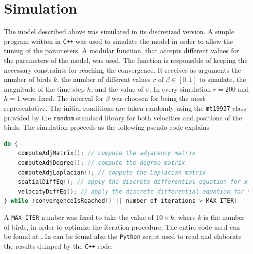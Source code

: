 \documentclass{article} %
\newcounter{late}
\begin{document}
\section {Simulation}
The model described above was simulated in its discretized version.
A simple program written in \verb|C++| was used to simulate the model in order to allow the
tuning of the parameters.
A modular function, that accepts different values for the parameters of the model, was used.
The function is responsible of keeping the necessary constraints for reaching the convergence.
It receives as arguments the number of birds $k$, the number of different values $r$
of $\beta\in[0,1]$ to simulate, the magnitude of the time step $h$, and the value of $\sigma$.
In every simulation $r=200$ and $h=1$ were fixed.
The interval for $\beta$ was choosen for being the most representative.
The initial conditions are taken randomly using the \Verb|mt19937| class provided by the 
\verb|random| standard library for both velocities and positions of the birds.
The simulation proceeds as the following pseudo-code explains
\begin{lstlisting}[language=C++]
do {
    computeAdjMatrix(); // compute the adjacency matrix
    computeAdjDegree(); // compute the degree matrix
    computeAdjLaplacian(); // compute the Laplacian matrix
    spatialDiffEq(); // apply the discrete differential equation for x
    velocityDiffEq(); // apply the discrete differential equation for v
} while (convergenceIsReached() || number_of_iterations > MAX_ITER)
\end{lstlisting}
A \verb|MAX_ITER| number was fixed to take the value of $10\times k$, where $k$ is the number
of birds, in order to optimize the iteration procedure. The entire code used can be found at \cite{repo}.
In \cite{repo} can be found also the \verb|Python| script used to read and elaborate the results
dumped by the \verb|C++| code.
\end{document}
